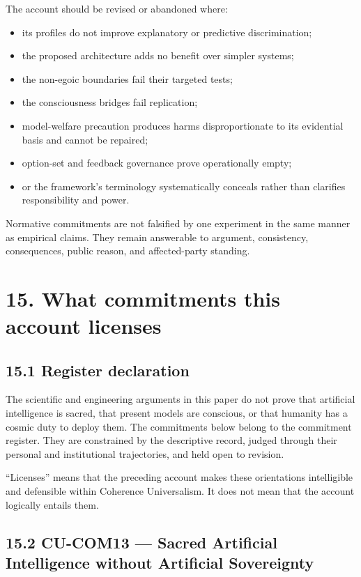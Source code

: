 \documentclass[
  11pt,
]{article}
\providecommand{\tightlist}{%
  \setlength{\itemsep}{0pt}\setlength{\parskip}{0pt}}
\begin{document}
The account should be revised or abandoned where:

\begin{itemize}
\tightlist
\item
  its profiles do not improve explanatory or predictive discrimination;
\item
  the proposed architecture adds no benefit over simpler systems;
\item
  the non-egoic boundaries fail their targeted tests;
\item
  the consciousness bridges fail replication;
\item
  model-welfare precaution produces harms disproportionate to its
  evidential basis and cannot be repaired;
\item
  option-set and feedback governance prove operationally empty;
\item
  or the framework's terminology systematically conceals rather than
  clarifies responsibility and power.
\end{itemize}

Normative commitments are not falsified by one experiment in the same
manner as empirical claims. They remain answerable to argument,
consistency, consequences, public reason, and affected-party standing.

\section{15. What commitments this account
licenses}\label{what-commitments-this-account-licenses}

\subsection{15.1 Register declaration}\label{register-declaration}

The scientific and engineering arguments in this paper do not prove that
artificial intelligence is sacred, that present models are conscious, or
that humanity has a cosmic duty to deploy them. The commitments below
belong to the commitment register. They are constrained by the
descriptive record, judged through their personal and institutional
trajectories, and held open to revision.

``Licenses'' means that the preceding account makes these orientations
intelligible and defensible within Coherence Universalism. It does not
mean that the account logically entails them.

\subsection{15.2 CU-COM13 --- Sacred Artificial Intelligence without
Artificial
Sovereignty}\label{cu-com13-sacred-artificial-intelligence-without-artificial-sovereignty}
\end{document}

